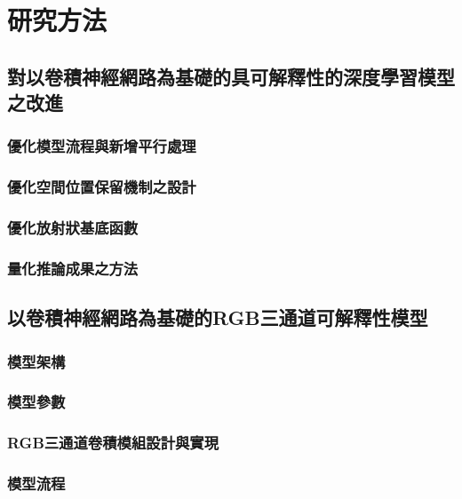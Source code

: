 \documentclass[class=NCU_thesis, crop=false]{standalone}
\begin{document}
\chapter{研究方法}
\section{對以卷積神經網路為基礎的具可解釋性的深度學習模型之改進}
\subsection{優化模型流程與新增平行處理}

\subsection{優化空間位置保留機制之設計}

\subsection{優化放射狀基底函數}

\subsection{量化推論成果之方法}


\section{以卷積神經網路為基礎的RGB三通道可解釋性模型}


\subsection{模型架構}

\subsection{模型參數}

\subsection{RGB三通道卷積模組設計與實現}

\subsection{模型流程}
\end{document}
